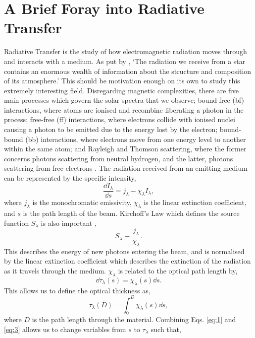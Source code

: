 \section{A Brief Foray into Radiative Transfer}
Radiative Transfer is the study of how electromagnetic radiation moves through and interacts with a medium. As put by \cite{hubeny_theory_2015}, `The radiation we receive from a star contains an enormous wealth of information about the structure and composition of its atmosphere.' This should be motivation enough on its own to study this extremely interesting field. Disregarding magnetic complexities, there are  five main processes which govern the solar spectra that we observe; bound-free (bf) interactions, where atoms are ionised and recombine liberating a photon in the process; free-free (ff) interactions, where electrons collide with ionised nuclei causing a photon to be emitted due to the energy lost by the electron; bound-bound (bb) interactions, where electrons move from one energy level to another within the same atom; and Rayleigh and Thomson scattering, where the former concerns photons scattering from neutral hydrogen, and the latter, photons scattering from free electrons \citep{rutten_introduction_1993}. The radiation received from an emitting medium can be represented by the specific intensity,
\begin{equation}
    \frac{\dd I_\lambda}{\dd s}=j_\lambda-\chi_\lambda I_\lambda,
    \label{eq:1}
\end{equation}
where $j_\lambda$ is the monochromatic emissivity, $\chi_\lambda$ is the linear extinction coefficient, and $s$ is the path length of the beam. Kirchoff's Law which defines the source function $S_\lambda$ is also important \citep{woan_cambridge_2000},
\begin{equation}
    S_\lambda\equiv\frac{j_\lambda}{\chi_\lambda}.
\end{equation}
This describes the energy of new photons entering the beam, and is normalised by the linear extinction coefficient which describes the extinction of the radiation as it travels through the medium. $\chi_\lambda$ is related to the optical path length by,
\begin{equation}
    \dd\tau_\lambda(s)=\chi_\lambda(s)\dd s.
    \label{eq:3}
\end{equation}
This allows us to define the optical thickness as,
\begin{equation}
    \tau_\lambda(D)=\int_0^D\chi_\lambda(s)\dd s,
\end{equation}
where $D$ is the path length through the material. Combining Eqs. \ref{eq:1} and \ref{eq:3} allows us to change variables from $s$ to $\tau_\lambda$ such that,
